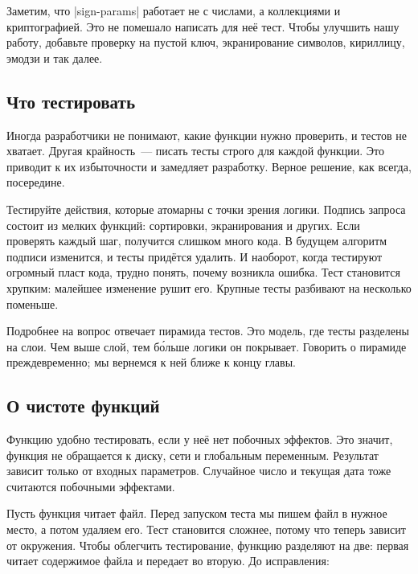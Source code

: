 Заметим, что \spverb|sign-params| работает не с числами, а коллекциями и
криптографией. Это не помешало написать для не\"{е} тест. Чтобы улучшить нашу
работу, добавьте проверку на пустой ключ, экранирование символов, кириллицу,
эмодзи и так далее.

\subsection{Что тестировать}

Иногда разработчики не понимают, какие функции нужно проверить, и тестов не
хватает. Другая крайность~--- писать тесты строго для каждой функции. Это
приводит к их избыточности и замедляет разработку. Верное решение, как всегда,
посередине.

Тестируйте действия, которые атомарны с точки зрения логики. Подпись запроса
состоит из мелких функций: сортировки, экранирования и других. Если проверять
каждый шаг, получится слишком много кода. В будущем алгоритм подписи изменится,
и тесты прид\"{е}тся удалить. И наоборот, когда тестируют огромный пласт кода,
трудно понять, почему возникла ошибка. Тест становится хрупким: малейшее
изменение рушит его. Крупные тесты разбивают на несколько поменьше.


Подробнее на вопрос отвечает пирамида тестов.
Это модель, где тесты разделены на слои. Чем выше слой, тем б\'{о}льше логики он
покрывает. Говорить о пирамиде преждевременно; мы вернемся к ней ближе к концу
главы.

\subsection{О чистоте функций}


Функцию удобно тестировать, если у не\"{е} нет побочных эффектов. Это значит,
функция не обращается к диску, сети и глобальным переменным. Результат зависит
только от входных параметров. Случайное число и текущая дата тоже считаются
побочными эффектами.

Пусть функция читает файл. Перед запуском теста мы пишем файл в нужное место, а
потом удаляем его. Тест становится сложнее, потому что теперь зависит от
окружения. Чтобы облегчить тестирование, функцию разделяют на две: первая читает
содержимое файла и передает во вторую. До исправления:

